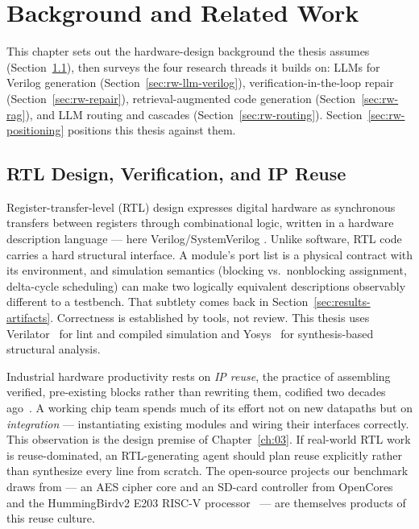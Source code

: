 
\chapter{Background and Related Work}
\label{ch:02}

This chapter sets out the hardware-design background the thesis assumes
(Section~\ref{sec:bg-rtl}), then surveys the four research threads it
builds on: LLMs for Verilog generation
(Section~\ref{sec:rw-llm-verilog}), verification-in-the-loop repair
(Section~\ref{sec:rw-repair}), retrieval-augmented code generation
(Section~\ref{sec:rw-rag}), and LLM routing and cascades
(Section~\ref{sec:rw-routing}). Section~\ref{sec:rw-positioning} positions
this thesis against them.

\section{RTL Design, Verification, and IP Reuse}
\label{sec:bg-rtl}

Register-transfer-level (RTL) design expresses digital hardware as
synchronous transfers between registers through combinational logic,
written in a hardware description language --- here Verilog/SystemVerilog
\citep{ieee1800}. Unlike software, RTL code carries a hard structural
interface. A module's port list is a physical contract with its
environment, and simulation semantics (blocking vs.\ nonblocking
assignment, delta-cycle scheduling) can make two logically equivalent
descriptions observably different to a testbench. That subtlety
comes back in Section~\ref{sec:results-artifacts}. Correctness is
established by tools, not review. This thesis uses
Verilator~\citep{verilator} for lint and compiled simulation and
Yosys~\citep{wolf2013yosys} for synthesis-based structural analysis.

Industrial hardware productivity rests on \emph{IP reuse}, the practice
of assembling verified, pre-existing blocks rather than rewriting them,
codified two decades ago~\citep{keating2002reuse}. A working chip team
spends much of its effort not on new datapaths but on \emph{integration}
--- instantiating existing modules and wiring their interfaces correctly.
This observation is the design premise of Chapter~\ref{ch:03}. If
real-world RTL work is reuse-dominated, an RTL-generating agent should
plan reuse explicitly rather than synthesize every line from scratch. The
open-source projects our benchmark draws from --- an AES cipher core and
an SD-card controller from OpenCores~\citep{opencores} and the
HummingBirdv2 E203 RISC-V processor~\citep{e203hbirdv2} --- are themselves
products of this reuse culture.

